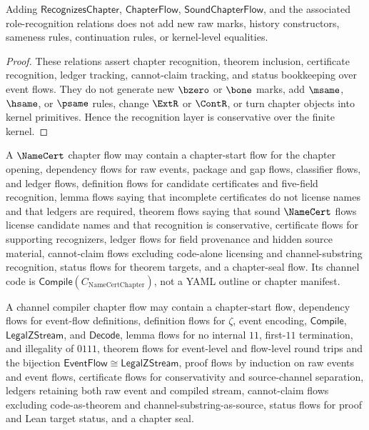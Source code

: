 \begin{theorem}
\label{thm:chapter-generated-conservativity}
Adding $\mathsf{RecognizesChapter}$, $\mathsf{ChapterFlow}$, $\mathsf{SoundChapterFlow}$, and the associated role-recognition relations does not add new raw marks, history constructors, sameness rules, continuation rules, or kernel-level equalities.
\end{theorem}

\begin{proof}
These relations assert chapter recognition, theorem inclusion, certificate recognition, ledger tracking, cannot-claim tracking, and status bookkeeping over event flows. They do not generate new $\bzero$ or $\bone$ marks, add $\msame$, $\hsame$, or $\psame$ rules, change $\ExtR$ or $\ContR$, or turn chapter objects into kernel primitives. Hence the recognition layer is conservative over the finite kernel.
\end{proof}

\begin{example}
\label{ex:chapter-generated-namecert-chapter-flow}
A $\NameCert$ chapter flow may contain a chapter-start flow for the chapter opening, dependency flows for raw events, package and gap flows, classifier flows, and ledger flows, definition flows for candidate certificates and five-field recognition, lemma flows saying that incomplete certificates do not license names and that ledgers are required, theorem flows saying that sound $\NameCert$ flows license candidate names and that recognition is conservative, certificate flows for supporting recognizers, ledger flows for field provenance and hidden source material, cannot-claim flows excluding code-alone licensing and channel-substring recognition, status flows for theorem targets, and a chapter-seal flow. Its channel code is $\mathsf{Compile}(C_{\mathrm{NameCertChapter}})$, not a YAML outline or chapter manifest.
\end{example}

\begin{example}
\label{ex:chapter-generated-compiler-chapter-flow}
A channel compiler chapter flow may contain a chapter-start flow, dependency flows for event-flow definitions, definition flows for $\zeta$, event encoding, $\mathsf{Compile}$, $\mathsf{LegalZStream}$, and $\mathsf{Decode}$, lemma flows for no internal $11$, first-$11$ termination, and illegality of $0111$, theorem flows for event-level and flow-level round trips and the bijection $\mathsf{EventFlow}\cong\mathsf{LegalZStream}$, proof flows by induction on raw events and event flows, certificate flows for conservativity and source-channel separation, ledgers retaining both raw event and compiled stream, cannot-claim flows excluding code-as-theorem and channel-substring-as-source, status flows for proof and Lean target status, and a chapter seal.
\end{example}

